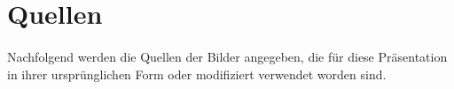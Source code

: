 \section{Quellen}


\STANDARD{\insertsection}
{ 
  \framesubtitle{\insertsubsection}
  
  Nachfolgend werden die Quellen der Bilder angegeben, 
  die für diese Präsentation in ihrer ursprünglichen Form oder modifiziert verwendet worden sind.

  \nocite{*}

  
  
}